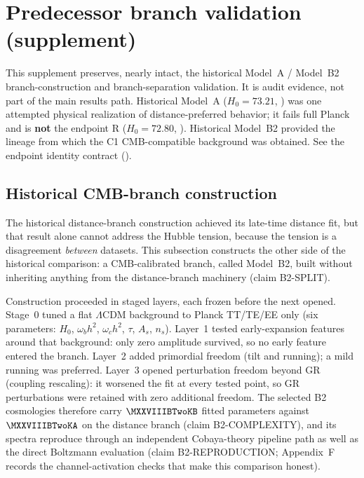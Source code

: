 \section{Predecessor branch validation (supplement)}
\label{sec:predecessor-branches}

This supplement preserves, nearly intact, the historical Model~A /
Model~B2 branch-construction and branch-separation validation. It is
audit evidence, not part of the main results path. Historical Model~A
($H_{0}=73.21$,
) was one
attempted physical realization of distance-preferred behavior; it fails
full Planck and is \textbf{not} the endpoint R ($H_{0}=72.80$,
). Historical Model~B2
provided the lineage from which the C1 CMB-compatible background was
obtained. See the endpoint identity contract
().

\subsection{Historical CMB-branch construction}
\label{sec:b2branch}

The historical distance-branch construction achieved its late-time
distance fit, but that result alone cannot address the Hubble tension,
because the tension is a disagreement \textit{between} datasets. This
subsection constructs the other side of the historical comparison: a
CMB-calibrated branch, called Model~B2, built without inheriting
anything from the distance-branch machinery (claim B2-SPLIT).

Construction proceeded in staged layers, each frozen before the next
opened. Stage~0 tuned a flat $\Lambda$CDM background to Planck
TT/TE/EE only (six parameters:
$H_{0}$, $\omega_{b}h^{2}$, $\omega_{c}h^{2}$, $\tau$, $A_{s}$,
$n_{s}$). Layer~1 tested early-expansion features around that
background: only zero amplitude survived, so no early feature entered
the branch. Layer~2 added primordial freedom (tilt and running);
a mild running was preferred. Layer~3 opened perturbation freedom
beyond GR (coupling rescaling): it worsened the fit at every tested
point, so GR perturbations were retained with zero additional freedom.
The selected B2 cosmologies therefore carry
$\MXXVIIIBTwoKB$ fitted parameters against $\MXXVIIIBTwoKA$ on the
distance branch (claim B2-COMPLEXITY), and its spectra reproduce
through an independent Cobaya-theory pipeline path as well as the
direct Boltzmann evaluation (claim B2-REPRODUCTION; Appendix~F
records the channel-activation checks that make this comparison
honest).

